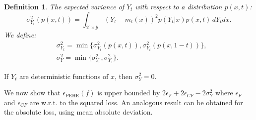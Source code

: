 \documentclass{article}
\newtheorem{thmappdef}{Definition}
\def\cX{\mathcal X}
\def\cY{\mathcal Y}
\def \epehe{\epsilon_{\text{PEHE}}}
\begin{document}
\begin{thmappdef}\label{def:sigma2}
The expected variance of $Y_t$ with respect to a distribution $p(x,t)$:
$$\sigma^2_{Y_t}(p(x,t)) = \int_{\cX \times \cY} \left(Y_t - m_t(x)\right)^2 p(Y_t|x)p(x,t) \, dY_t dx .$$
We define:
\begin{align*}
&\sigma^2_{Y_t} = \min\{\sigma^2_{Y_t}(p(x,t)), \sigma^2_{Y_t}(p(x,1-t))\} , \\
&\sigma^2_{Y} = \min\{\sigma^2_{Y_0},\sigma^2_{Y_1}\}.
\end{align*}
\end{thmappdef}
If $Y_t$ are deterministic functions of $x$, then $\sigma^2_{Y} = 0$.


We now show that $\epehe(f)$ is upper bounded by $2 \epsilon_F + 2 \epsilon_{CF} - 2\sigma^2_Y$ where $\epsilon_F$ and $\epsilon_{CF}$ are w.r.t. to the squared loss. An analogous result can be obtained for the absolute loss, using mean absolute deviation. 
\end{document}
